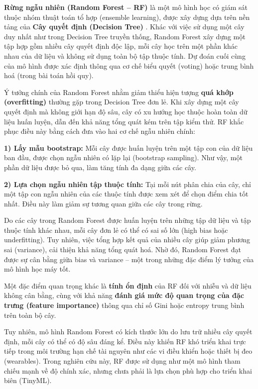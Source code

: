 \textbf{Rừng ngẫu nhiên (Random Forest – RF)} là một mô hình học có 
giám sát thuộc nhóm thuật toán tổ hợp (ensemble learning), 
được xây dựng dựa trên nền tảng của 
\textbf{Cây quyết định (Decision Tree)} \cite{breiman2001random}. 
Khác với việc sử dụng một cây duy nhất như trong Decision Tree 
truyền thống, Random Forest xây dựng một tập hợp gồm nhiều cây 
quyết định độc lập, mỗi cây học trên một phần khác nhau của dữ liệu và 
không sử dụng toàn bộ tập thuộc tính. Dự đoán cuối cùng của mô hình 
được xác định thông qua cơ chế biểu quyết (voting) hoặc trung bình hoá 
(trong bài toán hồi quy).

Ý tưởng chính của Random Forest nhằm giảm thiểu hiện tượng 
\textbf{quá khớp (overfitting)} thường gặp trong Decision Tree đơn lẻ. 
Khi xây dựng một cây quyết định mà không giới hạn độ sâu, 
cây có xu hướng học thuộc hoàn toàn dữ liệu huấn luyện, 
dẫn đến khả năng tổng quát kém trên tập kiểm thử. 
RF khắc phục điều này bằng cách đưa vào hai cơ chế ngẫu nhiên chính:

\vspace{0.5em}
\noindent\textbf{1) Lấy mẫu bootstrap:} Mỗi cây được huấn luyện trên 
một tập con của dữ liệu ban đầu, được chọn ngẫu nhiên có lặp lại 
(bootstrap sampling). Như vậy, một phần dữ liệu được bỏ qua, 
làm tăng tính đa dạng giữa các cây.

\vspace{0.5em}
\noindent\textbf{2) Lựa chọn ngẫu nhiên tập thuộc tính:} Tại mỗi nút 
phân chia của cây, chỉ một tập con ngẫu nhiên của các thuộc tính được 
xem xét để chọn điểm chia tốt nhất. Điều này làm giảm sự tương quan 
giữa các cây trong rừng.

Do các cây trong Random Forest được huấn luyện trên những tập dữ liệu 
và tập thuộc tính khác nhau, mỗi cây đơn lẻ có thể có sai số lớn 
(high bias hoặc underfitting). Tuy nhiên, việc tổng hợp kết quả của 
nhiều cây giúp giảm phương sai (variance), cải thiện khả năng tổng 
quát hoá. Nhờ đó, Random Forest đạt được sự cân bằng giữa bias và 
variance – một trong những đặc điểm lý tưởng của mô hình học máy tốt.

Một đặc điểm quan trọng khác là \textbf{tính ổn định} của RF 
đối với nhiễu và dữ liệu không cân bằng, cùng với khả năng 
\textbf{đánh giá mức độ quan trọng của đặc trưng (feature importance)} 
thông qua chỉ số Gini hoặc entropy trung bình trên toàn bộ cây.

Tuy nhiên, mô hình Random Forest có kích thước lớn do lưu trữ nhiều 
cây quyết định, mỗi cây có thể có độ sâu đáng kể. Điều này khiến RF 
khó triển khai trực tiếp trong môi trường hạn chế tài nguyên như các 
vi điều khiển hoặc thiết bị đeo (wearables). Trong nghiên cứu này, 
RF được sử dụng như một mô hình tham chiếu mạnh về độ chính xác, 
nhưng chưa phải là lựa chọn phù hợp cho triển khai biên (TinyML).


